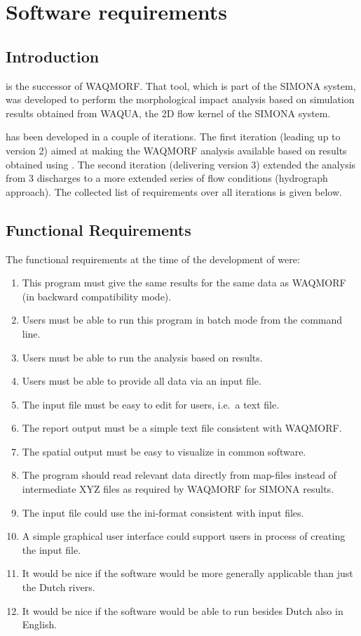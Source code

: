 \chapter{Software requirements}

\section{Introduction}

\dfastmi is the successor of WAQMORF.
That tool, which is part of the SIMONA system, was developed to perform the morphological impact analysis based on simulation results obtained from WAQUA, the 2D flow kernel of the SIMONA system.

\dfmi has been developed in a couple of iterations.
The first iteration (leading up to version 2) aimed at making the WAQMORF analysis available based on results obtained using \dflowfm.
The second iteration (delivering version 3) extended the analysis from 3 discharges to a more extended series of flow conditions (hydrograph approach).
The collected list of requirements over all iterations is given below.

\section{Functional Requirements} \label{Sec:FuncReq}

The functional requirements at the time of the development of  were:

\begin{enumerate}
\item This program must give the same results for the same data as WAQMORF (in backward compatibility mode).
\item Users must be able to run this program in batch mode from the command line.
\item Users must be able to run the analysis based on \dflowfm results.
\item Users must be able to provide all data via an input file.
\item The input file must be easy to edit for users, i.e.~a text file.
\item The report output must be a simple text file consistent with WAQMORF.
\item The spatial output must be easy to visualize in common software.

\item The program should read relevant data directly from \dflowfm map-files instead of intermediate XYZ files as required by WAQMORF for SIMONA results.

\item The input file could use the ini-format consistent with \dflowfm input files.
\item A simple graphical user interface could support users in process of creating the input file.

\item It would be nice if the software would be more generally applicable than just the Dutch rivers.
\item It would be nice if the software would be able to run besides Dutch also in English.
\end{enumerate}

